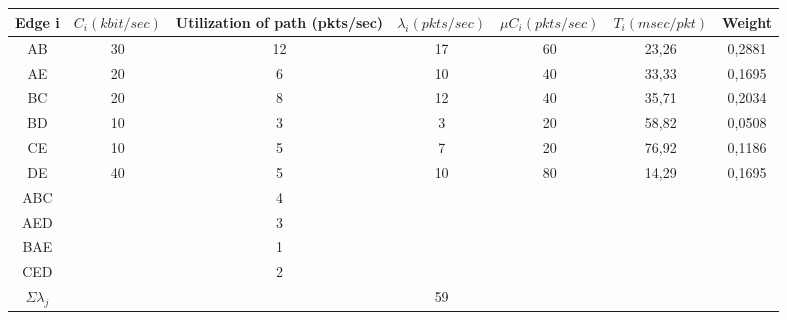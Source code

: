 \documentclass[a4paper,
			llpt,
			solution,
			accentcolor=tud2d,
			colorbacktitle
			]
			{tudexercise}
\begin{document}
\subsection{}
\begin{center}
\begin{tabular}{|c|c|c|c|c|c|c|}
\hline
Edge i
&
$C_{i} (kbit/sec)$
&
Utilization of path (pkts/sec)
&
$\lambda_{i}(pkts/sec)$
&
$\mu C_{i}(pkts/sec)$
&
$T_{i}(msec/pkt)$
&
Weight
\\ \hline
AB & 30 & 12 & 17 & 60 & 23,26 & 0,2881 \\ \hline
AE & 20 & 6 & 10 & 40 & 33,33 & 0,1695 \\ \hline
BC & 20 & 8 & 12 & 40 & 35,71 & 0,2034 \\ \hline
BD & 10 & 3 & 3 & 20 & 58,82 & 0,0508 \\ \hline
CE & 10 & 5 & 7 & 20 & 76,92 & 0,1186 \\ \hline
DE & 40 & 5 & 10 & 80 & 14,29 & 0,1695 \\ \hline
ABC &   & 4 &    &    &       &\\ \hline
AED &   & 3 &    &    &       &\\ \hline
BAE &   & 1 &    &    &       &\\ \hline
CED &   & 2 &    &    &       &\\ \hline
$\Sigma \lambda _{j}$ & & & 59 & & & \\ \hline
\end{tabular}
\end{center}
\end{document}
